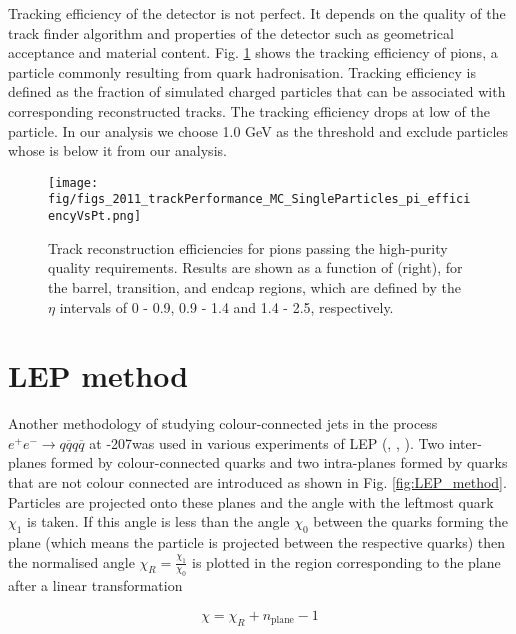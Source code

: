 Tracking efficiency of the detector is not perfect. It depends on the quality of the track finder algorithm and properties of the detector such as geometrical acceptance and material content. Fig. \ref{fig:2011_trackPerformance_MC_SingleParticles_pi_efficiencyVsPt}  shows the tracking efficiency of pions, a particle commonly resulting from quark hadronisation. Tracking efficiency is defined as the fraction of simulated charged particles that can be associated with corresponding reconstructed tracks. The tracking efficiency drops at low \pt of the particle. In our analysis we choose 1.0 GeV as the threshold and exclude particles whose \pt is below it from our analysis.

\begin{figure}[hbtp]
    \texttt{[image: fig/figs\_2011\_trackPerformance\_MC\_SingleParticles\_pi\_efficiencyVsPt.png]}
    \caption{Track reconstruction efficiencies for pions passing the high-purity quality requirements. Results are shown as a function of \pt (right), for the barrel, transition, and endcap regions, which are defined by the $\eta$ intervals of 0 - 0.9, 0.9 - 1.4 and 1.4 - 2.5, respectively. \cite{Chatrchyan:2014fea}}
    \label{fig:2011_trackPerformance_MC_SingleParticles_pi_efficiencyVsPt}
\end{figure}

\section{LEP method}

Another methodology of studying colour-connected jets in the process $e^{+}e^{-}\rightarrow q\overline{q}q\overline{q}$ at -207\GeV was used in various experiments of LEP (\cite{Abdallah:2006uq}, \cite{Abbiendi:2005es}, \cite{Achard:2003pe}). Two inter-\PW planes formed by colour-connected quarks and two intra-\PW planes formed by quarks that are not colour connected are introduced as shown in Fig. \ref{fig:LEP_method}. Particles are projected onto these planes and the angle with the leftmost quark $\chi_{1}$ is taken. If this angle is less than the angle $\chi_{0}$ between the quarks forming the plane (which means the particle is projected between the respective quarks) then the normalised angle $\chi_{R}=\frac{\chi_{1}}{\chi_{0}}$ is plotted in the region corresponding to the plane after a linear transformation

\begin{equation}
  \chi=\chi_{R} + n_{\text{plane}} - 1
\end{equation}

